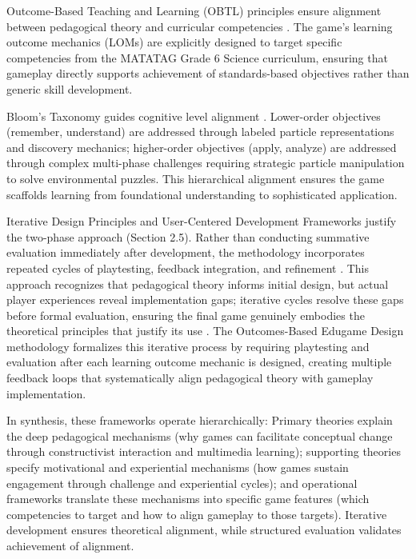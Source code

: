 Outcome-Based Teaching and Learning (OBTL) principles ensure alignment between pedagogical theory and curricular competencies \cite{Sison2018}. The game's learning outcome mechanics (LOMs) are explicitly designed to target specific competencies from the MATATAG Grade 6 Science curriculum, ensuring that gameplay directly supports achievement of standards-based objectives rather than generic skill development.

Bloom's Taxonomy guides cognitive level alignment \cite{Anderson2001}. Lower-order objectives (remember, understand) are addressed through labeled particle representations and discovery mechanics; higher-order objectives (apply, analyze) are addressed through complex multi-phase challenges requiring strategic particle manipulation to solve environmental puzzles. This hierarchical alignment ensures the game scaffolds learning from foundational understanding to sophisticated application.

Iterative Design Principles and User-Centered Development Frameworks justify the two-phase approach (Section 2.5). Rather than conducting summative evaluation immediately after development, the methodology incorporates repeated cycles of playtesting, feedback integration, and refinement \cite{Gee2003, Prensky2001}. This approach recognizes that pedagogical theory informs initial design, but actual player experiences reveal implementation gaps; iterative cycles resolve these gaps before formal evaluation, ensuring the final game genuinely embodies the theoretical principles that justify its use \cite{Sison2018}. The Outcomes-Based Edugame Design methodology \cite{Sison2018} formalizes this iterative process by requiring playtesting and evaluation after each learning outcome mechanic is designed, creating multiple feedback loops that systematically align pedagogical theory with gameplay implementation.

In synthesis, these frameworks operate hierarchically: Primary theories explain the deep pedagogical mechanisms (why games can facilitate conceptual change through constructivist interaction and multimedia learning); supporting theories specify motivational and experiential mechanisms (how games sustain engagement through challenge and experiential cycles); and operational frameworks translate these mechanisms into specific game features (which competencies to target and how to align gameplay to those targets). Iterative development ensures theoretical alignment, while structured evaluation validates achievement of alignment.


